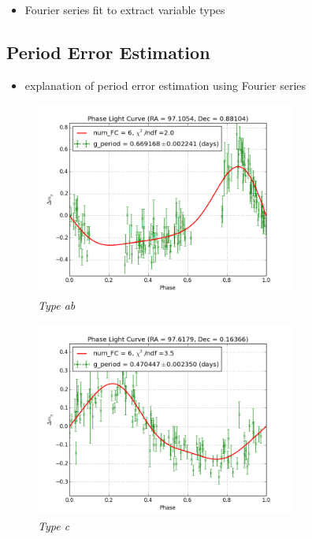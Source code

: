 \documentclass[aps,prl,twocolumn,superscriptaddress]{revtex4-1}
\begin{document}
\begin{itemize}
	\item{} Fourier series fit to extract variable types
\end{itemize}

\subsection{Period Error Estimation}

\begin{itemize}
	\item{} explanation of period error estimation using Fourier series
\end{itemize}

\begin{figure}[H]
 \centering
 	\includegraphics[width=3.35in]{figures/FSP1_g_LC_rrrtest_p5_grp19.png}
 \caption{\it \small{Type ab}}
 \label{fig:quartiles}
\end{figure}

\begin{figure}[H]
 \centering
 	\includegraphics[width=3.35in]{figures/FSP1_g_LC_rrrtest_p5_grp7.png}
 \caption{\it \small{Type c}}
 \label{fig:quartiles}
\end{figure}
\end{document}
